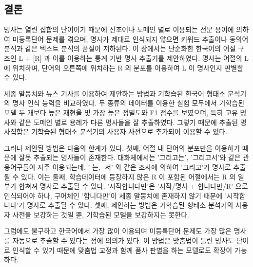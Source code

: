 \documentclass[11pt]{article}
\begin{document}
\subsection{결론}
명사는 열린 집합의 단어이기 때문에 신조어나 도메인 별로 이용되는 전문 용어에 의하여 미등록단어 문제를 겪으며, 명사가 제대로 인식되지 않으면 키워드 추출이나 동의어 분석과 같은 텍스트 분석의 품질이 저하된다.
이 장에서는 단순화한 한국어의 어절 구조인 L + [R] 과 이를 이용하는 통계 기반 명사 추출기를 제안하였다.
명사는 어절의 L 에 위치하며, 단어의 오른쪽에 위치하는 R 의 분포를 이용하여 L 이 명사인지 판별할 수 있다.

세종 말뭉치와 뉴스 기사를 이용하여 제안하는 방법과 기학습된 한국어 형태소 분석기의 명사 인식 능력을 비교하였다.
두 종류의 데이터를 이용한 실험 모두에서 기학습된 모델 두 개보다 높은 재현율 및 가장 높은 정밀도와 F1 점수를 보였으며, 특히 고유 명사와 같은 도메인 별로 용례가 다른 명사들을 잘 추출하였다. 그렇기 때문에 추출된 명사집합은 기학습된 형태소 분석기의 사용자 사전으로 추가되어 이용할 수 있다.

그러나 제안된 방법은 다음의 한계가 있다.
첫째, 어절 내 단어의 분포만을 이용하기 때문에 잘못 추출되는 명사들이 존재한다.
대화체에서는 '그리고는', '그리고서'와 같은 관용어구들이 자주 이용되는데, '-는, -서' 와 같은 조사에 의하여 '그리고'가 명사로 추출될 수 있다.
이는 
둘째, 학습데이터에 등장하지 않은 R 이 포함된 어절에서는 R 의 일부가 합쳐져 명사로 추출될 수 있다.
'시작합니다만'은 '시작/명사 + 합니다만/R' 으로 인식되어야 하나, 구어체인 '합니다만'이 세종 말뭉치에 존재하지 않기 때문에 '시작합니다'가 명사로 추출될 수 있다.
셋째, 제안하는 방법은 기학습된 형태소 분석기의 사용자 사전을 보강하는 것일 뿐, 기학습된 모델을 보강하지는 못한다.

그럼에도 불구하고 한국어에서 가장 많이 이용되며 미등록단어 문제도 가장 많은 명사를 자동으로 추출할 수 있다는 점에 의의가 있다.
이 방법은 맞춤법이 틀린 명사도 단어로 인식할 수 있기 때문에 맞춤법 교정과 함께 품사 판별을 하는 모델로도 확장이 가능하다.
\end{document}
